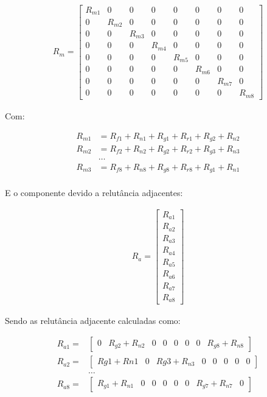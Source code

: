 \begin{align}
  R_m  = 
	\begin{bmatrix}
			 R_{m1} & 0 & 0 & 0 & 0 & 0 & 0 & 0 \\
			 0 & R_{m2} & 0 & 0 & 0 & 0 & 0 & 0 \\
			 0 & 0 & R_{m3} & 0 & 0 & 0 & 0 & 0 \\
			 0 & 0 & 0 & R_{m4} & 0 & 0 & 0 & 0 \\
			 0 & 0 & 0 & 0 & R_{m5} & 0 & 0 & 0 \\
			 0 & 0 & 0 & 0 & 0 & R_{m6} & 0 & 0 \\
			 0 & 0 & 0 & 0 & 0 & 0 & R_{m7} & 0  \\
 			 0 & 0 & 0 & 0 & 0 & 0 & 0 & R_{m8} 
	\end{bmatrix}
 \end{align}
 
Com:
 
 \begin{align}
	 R_{m1} &= R_{f1} + R_{n1} + R_{g1} + R_{r1} + R_{g2} + R_{n2} \\
	 R_{m2} &= R_{f2} + R_{n2} + R_{g2} + R_{r2} + R_{g3} + R_{n3}  \\
	 & \ldots \\
 	 R_{m3} &= R_{f8} + R_{n8} + R_{g8} + R_{r8} + R_{g1} + R_{n1}  \\
 \end{align}

E o componente devido a relutância adjacentes:

\begin{align}
R_a =
	\begin{bmatrix}
		R_{a1} \\ 	R_{a2} \\ 	R_{a3} \\ 	R_{a4} \\ 
		R_{a5} \\ 	R_{a6} \\ 	R_{a7} \\ 	R_{a8} 
	\end{bmatrix}
\end{align}

Sendo as relutância adjacente calculadas como:

 \begin{align}
	 R_{a1} =& 
	 \begin{bmatrix}
			0 & R_{g2} + R_{n2} & 0 & 0 & 0 & 0 & 0 & R_{g8}+R_{n8}
	 \end{bmatrix} \\
	 R_{a2} =&
	 \begin{bmatrix}
		R{g1}+R{n1} & 0 & R{g3}+R_{n3} & 0 & 0 & 0 & 0 & 0
	 \end{bmatrix} \\
	 & \ldots \\
	 R_{a8} =&
	 \begin{bmatrix}
		R_{g1}+R_{n1} & 0 & 0 & 0 & 0  &0 & R_{g7}+R_{n7} & 0 
	 \end{bmatrix} 
 \end{align}

